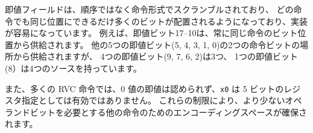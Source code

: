 \begin{commentary}
\begin{comment}
The immediate fields are scrambled in the instruction formats instead
of in sequential order so that as many bits as possible are in the
same position in every instruction, thereby simplifying
implementations. For example, immediate bits 17---10 are always sourced from
the same instruction bit positions.  Five other immediate bits (5, 4,
3, 1, and 0) have just two source instruction bits, while four (9, 7,
6, and 2) have three sources and one (8) has four sources.
\end{comment}
即値フィールドは、順序ではなく命令形式でスクランブルされており、
どの命令でも同じ位置にできるだけ多くのビットが配置されるようになっており、実装が容易になっています。
例えば、即値ビット17--10は、常に同じ命令のビット位置から供給されます。
他の5つの即値ビット(5, 4, 3, 1, 0)の2つの命令ビットの場所から供給されますが、
4つの即値ビット(9, 7, 6, 2)は3つ、
1つの即値ビット(8）は4つのソースを持っています。
\end{commentary}

\begin{comment}
For many RVC instructions, zero-valued immediates are disallowed and
{\tt x0} is not a valid 5-bit register specifier.  These restrictions
free up encoding space for other instructions requiring fewer operand
bits.
\end{comment}

また、多くの RVC 命令では、0 値の即値は認められず、{\tt x0} は 5 ビットのレジスタ指定としては有効ではありません。
これらの制限により、より少ないオペランドビットを必要とする他の命令のためのエンコーディングスペースが確保されます。

\newcommand{\rdprime}{rd\,$'$}
\newcommand{\rsoneprime}{rs1\,$'$}
\newcommand{\rstwoprime}{rs2\,$'$}

